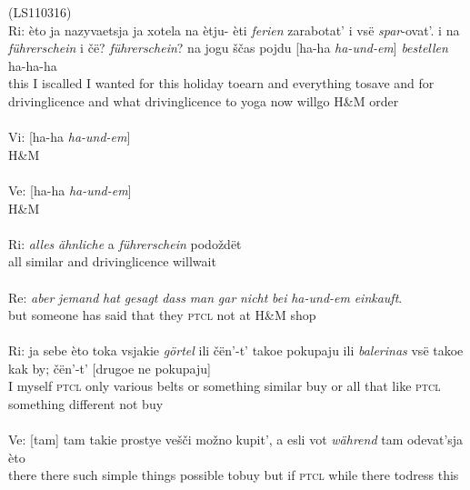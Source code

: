 \ea
\label{ex:3:2}
(LS110316)\\
 \gll Ri: èto ja nazyvaetsja ja xotela na ètju- èti \textit{ferien} zarabotat' i \phantom{m} \phantom{nn} vsë \textit{spar}-ovat'. i na \textit{führerschein} i čë? \phantom{mmmmmm} \phantom{nn} \textit{führerschein}? na jogu ščas pojdu [ha-ha \textit{ha-und-em}] \textit{bestellen} \phantom{m} \phantom{nn} ha-ha-ha\\
	{} this I is\textunderscore{}called I wanted for {} this holiday to{\textunderscore}earn and {} {} everything to{\textunderscore}save and for driving\textunderscore{}licence and what {} {} driving\textunderscore{}licence to yoga now will\textunderscore{}go {} H{\&}M order {} {} {}\\
\glt \hfill \\

\gll Vi: [ha-ha \textit{ha-und-em}]\\
	{} {} H{\&}M\\
	\glt \hfill \\
	
\gll Ve: [ha-ha \textit{ha-und-em}]\\
	{} {} H{\&}M\\
\glt \hfill \\

\gll Ri: \textit{alles} \textit{ähnliche} a \textit{führerschein} podoždët\\
	{}  all similar and driving\textunderscore{}licence will\textunderscore{}wait\\
\glt \hfill \\

\gll Re: \textit{aber} \textit{jemand} \textit{hat} \textit{gesagt} \textit{dass} \textit{man} \textit{gar} \textit{nicht} \textit{bei} \textit{ha-und-em} \phantom{mm} \phantom{mm} \phantom{mn} \textit{einkauft}.\\
	{} but someone has said that they \textsc{ptcl} not at H{\&}M {} {} {} shop\\
\glt \hfill \\

\gll Ri: ja sebe èto toka vsjakie \textit{görtel} ili čën'-t' takoe pokupaju
ili \phantom{nn} \textit{balerinas} vsë takoe kak by; čën'-t' [drugoe ne pokupaju]\\
	{} I myself \textsc{ptcl} only various belts or something similar buy or {} {} all that like \textsc{ptcl} something different not buy \\
\glt \hfill \\

\gll Ve: [tam] tam takie prostye vešči možno kupit', a esli vot \phantom{mmm} \phantom{nn}  \textit{während} tam odevat'sja èto\\
    {} there there such simple things possible to\textunderscore{}buy but if \textsc{ptcl} {} {} while there to\textunderscore{}dress this\\
\glt \hfill \\
    
